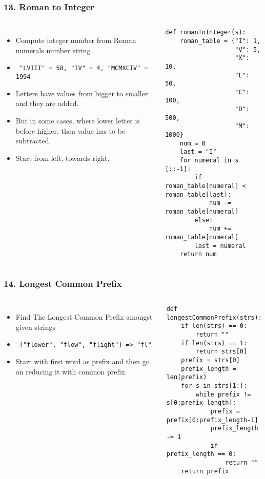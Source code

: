 \begin{frame}[fragile]\frametitle{13. Roman to Integer}

	\begin{columns}[T]
	\begin{itemize}
	\item Compute integer number from Roman numerals number string
	\item \lstinline{ "LVIII" = 58, "IV" = 4, "MCMXCIV" = 1994}
	\item Letters have values from bigger to smaller and they are added.
	\item But in some cases, where lower letter is before higher, then value has to be subtracted.
	\item Start from left, towards right.
	\end{itemize}
		\begin{lstlisting}[basicstyle=\scriptsize]
def romanToInteger(s):
    roman_table = {"I": 1,
                   "V": 5,
                   "X": 10,
                   "L": 50,
                   "C": 100,
                   "D": 500,
                   "M": 1000}
    num = 0
    last = "I"
    for numeral in s [::-1]:
        if roman_table[numeral] < roman_table[last]:
            num -= roman_table[numeral]
        else:
            num += roman_table[numeral]
        last = numeral
    return num
				\end{lstlisting}		

	\end{columns}
		
\end{frame}

\begin{frame}[fragile]\frametitle{14. Longest Common Prefix}

	\begin{columns}[T]
	\begin{itemize}
	\item Find The Longest Common Prefix amongst given strings
	\item \lstinline{ ["flower", "flow", "flight"] => "fl"}
	\item Start with first word as prefix and then go on reducing it with common prefix.
	\end{itemize}
		\begin{lstlisting}[basicstyle=\scriptsize]
def longestCommonPrefix(strs):
    if len(strs) == 0:
        return ""
    if len(strs) == 1:
        return strs[0]
    prefix = strs[0]
    prefix_length = len(prefix)
    for s in strs[1:]:
        while prefix != s[0:prefix_length]:
            prefix = prefix[0:prefix_length-1]
            prefix_length -= 1
            if prefix_length == 0:
                return ""
    return prefix
				\end{lstlisting}		

	\end{columns}
		
\end{frame}

